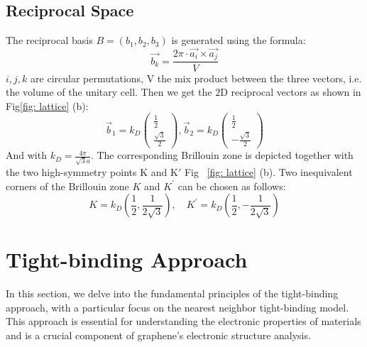 \subsection{Reciprocal Space}
The reciprocal basis $B=\left(b_{1}, b_{2}, b_{3}\right)$ is generated using the formula:
$$
\overrightarrow{b_{k}}=\frac{2 \pi \cdot \overrightarrow{a_{i}} \times \overrightarrow{a_{j}}}{V}
$$
$i, j, k$ are circular permutations, $\mathrm{V}$ the mix product between the three vectors, i.e. the volume of the unitary cell.  Then we get the $2 \mathrm{D}$ reciprocal vectors as shown in Fig\ref{fig: lattice} (b):
$$
\vec b_{1}=k_{D}\left(\begin{array}{l}
\frac{1}{2} \\
\frac{\sqrt{3}}{2} 
\end{array}\right),
\vec b_{2}=k_{D}\left(\begin{array}{c}
\frac{1}{2} \\
-\frac{\sqrt{3}}{2} 
\end{array}\right)
$$
And with $k_{D}=\frac{4 \pi}{\sqrt{3} a}$. The corresponding Brillouin zone is depicted together with the two high-symmetry points $\mathrm{K}$ and $\mathrm{K'}$ Fig ~\ref{fig: lattice} (b).
Two inequivalent corners of the Brillouin zone $K$ and $K^{\prime}$ can be chosen as follows:
$$
K=k_{D}\left(\frac{1}{2}, \frac{1}{2 \sqrt{3}}\right), \quad K^{\prime}=k_{D}\left(\frac{1}{2},-\frac{1}{2 \sqrt{3}}\right)
$$

\section{Tight-binding Approach \label{sec:tightbinding}}

In this section, we delve into the fundamental principles of the tight-binding approach, with a particular focus on the nearest neighbor tight-binding model. This approach is essential for understanding the electronic properties of materials and is a crucial component of graphene's electronic structure analysis.

